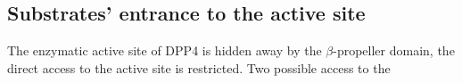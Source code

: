 \subsection{Substrates' entrance to the active site}

The enzymatic active site of DPP4 is hidden away by the $\beta$-propeller domain, the direct access to the active site is restricted. Two possible access to the 